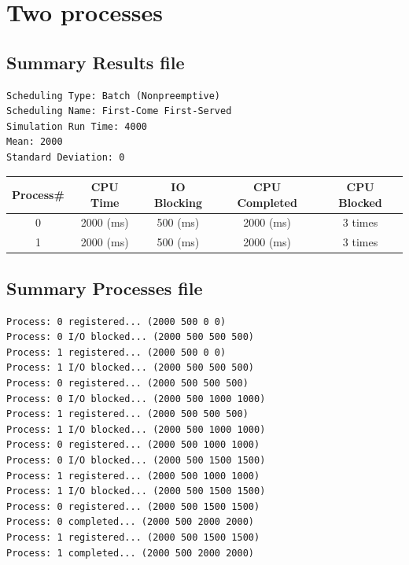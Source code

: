 \section{Two processes}
\subsection{Summary Results file}


\begin{lstlisting}
Scheduling Type: Batch (Nonpreemptive)
Scheduling Name: First-Come First-Served
Simulation Run Time: 4000
Mean: 2000
Standard Deviation: 0
\end{lstlisting}

\begin{center}
\begin{tabular}{| c | c | c | c | c |}
\hline
Process\# &	CPU Time &	IO Blocking & CPU Completed & CPU Blocked \\
\hline
0&		2000 (ms)&	500 (ms)&	2000 (ms)&	3 times \\
\hline
1&		2000 (ms)&	500 (ms)&	2000 (ms)&	3 times \\
\hline
\end{tabular}
\end{center}

\subsection{Summary Processes file}
\begin{lstlisting}
Process: 0 registered... (2000 500 0 0)
Process: 0 I/O blocked... (2000 500 500 500)
Process: 1 registered... (2000 500 0 0)
Process: 1 I/O blocked... (2000 500 500 500)
Process: 0 registered... (2000 500 500 500)
Process: 0 I/O blocked... (2000 500 1000 1000)
Process: 1 registered... (2000 500 500 500)
Process: 1 I/O blocked... (2000 500 1000 1000)
Process: 0 registered... (2000 500 1000 1000)
Process: 0 I/O blocked... (2000 500 1500 1500)
Process: 1 registered... (2000 500 1000 1000)
Process: 1 I/O blocked... (2000 500 1500 1500)
Process: 0 registered... (2000 500 1500 1500)
Process: 0 completed... (2000 500 2000 2000)
Process: 1 registered... (2000 500 1500 1500)
Process: 1 completed... (2000 500 2000 2000)
\end{lstlisting}
